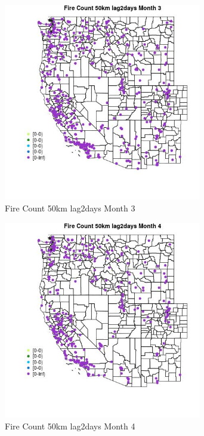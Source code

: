 \begin{figure} 
\centering  
\includegraphics[width=0.77\textwidth]{Code_Outputs/Report_ML_input_PM25_Step4_part_e_de_duplicated_aves_compiled_2019-05-18wNAs_MapObsMo3Fire_Count_50km_lag2days.jpg} 
\caption{\label{fig:Report_ML_input_PM25_Step4_part_e_de_duplicated_aves_compiled_2019-05-18wNAsMapObsMo3Fire_Count_50km_lag2days}Fire Count 50km lag2days Month 3} 
\end{figure} 
 

\begin{figure} 
\centering  
\includegraphics[width=0.77\textwidth]{Code_Outputs/Report_ML_input_PM25_Step4_part_e_de_duplicated_aves_compiled_2019-05-18wNAs_MapObsMo4Fire_Count_50km_lag2days.jpg} 
\caption{\label{fig:Report_ML_input_PM25_Step4_part_e_de_duplicated_aves_compiled_2019-05-18wNAsMapObsMo4Fire_Count_50km_lag2days}Fire Count 50km lag2days Month 4} 
\end{figure} 
 


